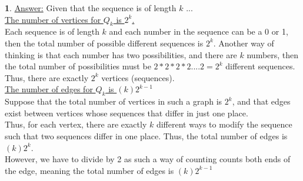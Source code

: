 \documentclass[12pt,a4paper]{article}
\theoremstyle{definition}
\newtheorem{problem}{}
\begin{document}
\begin{problem}
\underline{Answer:} Given that the sequence is of length $k$ ...\\
\underline{The number of vertices for $Q_k$ is $2^k$.} \\

Each sequence is of length $k$ and each number in the sequence can be a 0 or 1, then the total number of possible different sequences is $2^k$. Another way of thinking is that each number has two possibilities, and there are $k$ numbers, then the total number of possibilities must be $2*2*2*2....2 = 2^k$ different sequences. Thus, there are exactly $2^k$ vertices (sequences). \\

\underline{The number of edges for $Q_k$ is $(k)2^{k - 1}$} \\

Suppose that the total number of vertices in such a graph is $2^k$, and that edges exist between vertices whose sequences that differ in just one place. \\

Thus, for each vertex, there are exactly $k$ different ways to modify the sequence such that two sequences differ in one place. Thus, the total number of edges is $(k)2^k$. \\

However, we have to divide by 2 as such a way of counting counts both ends of the edge, meaning the total number of edges is $(k)2^{k - 1}$

\end{problem}
\end{document}
